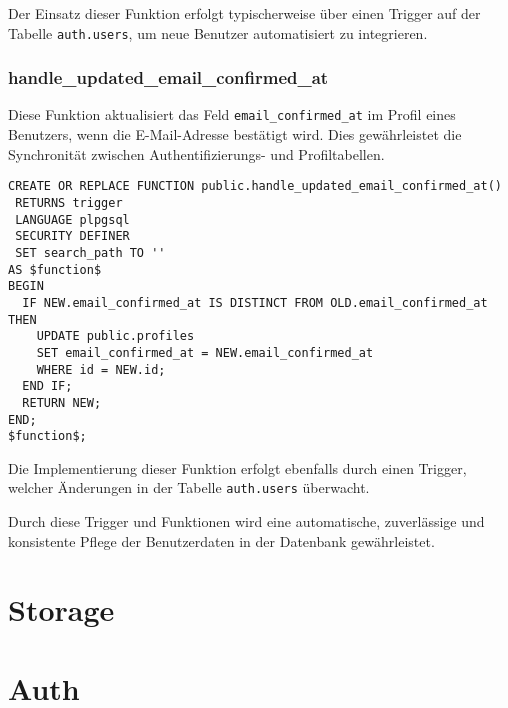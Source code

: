 \begin{inhalt}
Der Einsatz dieser Funktion erfolgt typischerweise über einen Trigger auf der Tabelle \texttt{auth.users}, um neue Benutzer automatisiert zu integrieren.

\subsubsection{handle\_updated\_email\_confirmed\_at}
Diese Funktion aktualisiert das Feld \texttt{email\_confirmed\_at} im Profil eines Benutzers, wenn die E-Mail-Adresse bestätigt wird. Dies gewährleistet die Synchronität zwischen Authentifizierungs- und Profiltabellen.

\begin{lstlisting}[style=mysql]
CREATE OR REPLACE FUNCTION public.handle_updated_email_confirmed_at()
 RETURNS trigger
 LANGUAGE plpgsql
 SECURITY DEFINER
 SET search_path TO ''
AS $function$
BEGIN
  IF NEW.email_confirmed_at IS DISTINCT FROM OLD.email_confirmed_at THEN
    UPDATE public.profiles
    SET email_confirmed_at = NEW.email_confirmed_at
    WHERE id = NEW.id;
  END IF;
  RETURN NEW;
END;
$function$;
\end{lstlisting}

Die Implementierung dieser Funktion erfolgt ebenfalls durch einen Trigger, welcher Änderungen in der Tabelle \texttt{auth.users} überwacht.

Durch diese Trigger und Funktionen wird eine automatische, zuverlässige und konsistente Pflege der Benutzerdaten in der Datenbank gewährleistet.


\section{Storage}

\section{Auth}









\end{inhalt}
